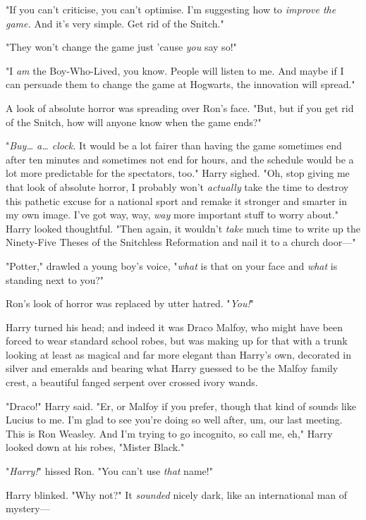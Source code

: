 "If you can't criticise, you can't optimise. I'm suggesting how to
\emph{improve the game.} And it's very simple. Get rid of the Snitch."

"They won't change the game just 'cause \emph{you} say so!"

"I \emph{am} the Boy-Who-Lived, you know. People will listen to me. And maybe
if I can persuade them to change the game at Hogwarts, the innovation will
spread."

A look of absolute horror was spreading over Ron's face. "But, but if you get
rid of the Snitch, how will anyone know when the game ends?"

"\emph{Buy{\ldots} a{\ldots} clock.} It would be a lot fairer than having the
game sometimes end after ten minutes and sometimes not end for hours, and the
schedule would be a lot more predictable for the spectators, too." Harry
sighed. "Oh, stop giving me that look of absolute horror, I probably won't
\emph{actually} take the time to destroy this pathetic excuse for a national
sport and remake it stronger and smarter in my own image. I've got way, way,
\emph{way} more important stuff to worry about." Harry looked thoughtful. "Then
again, it wouldn't \emph{take} much time to write up the Ninety-Five Theses of
the Snitchless Reformation and nail it to a church door---"

"Potter," drawled a young boy's voice, "\emph{what} is that on your face and
\emph{what} is standing next to you?"

Ron's look of horror was replaced by utter hatred. "\emph{You!}"

Harry turned his head; and indeed it was Draco Malfoy, who might have been
forced to wear standard school robes, but was making up for that with a trunk
looking at least as magical and far more elegant than Harry's own, decorated in
silver and emeralds and bearing what Harry guessed to be the Malfoy family
crest, a beautiful fanged serpent over crossed ivory wands.

"Draco!" Harry said. "Er, or Malfoy if you prefer, though that kind of sounds
like Lucius to me. I'm glad to see you're doing so well after, um, our last
meeting. This is Ron Weasley. And I'm trying to go incognito, so call me, eh,"
Harry looked down at his robes, "Mister Black."

"\emph{Harry!}" hissed Ron. "You can't use \emph{that} name!"

Harry blinked. "Why not?" It \emph{sounded} nicely dark, like an international
man of mystery---

